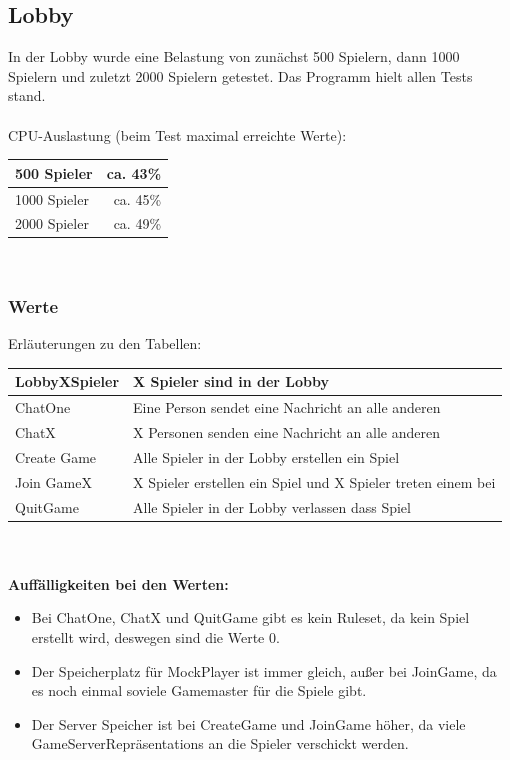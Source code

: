 \documentclass[a4paper]{article}
\begin{document}
\subsection{Lobby}
In der Lobby wurde eine Belastung von zunächst 500 Spielern, dann 1000 Spielern und zuletzt 2000 Spielern getestet. Das Programm hielt allen Tests stand.
\ \\ \ \\
\noindent
CPU-Auslastung (beim Test maximal erreichte Werte):\\
\noindent
\begin{tabular}{|l|r|}
\hline 
500 Spieler & ca. 43\% \\ \hline
1000 Spieler & ca. 45\% \\ \hline
2000 Spieler & ca. 49\%\\ \hline
\end{tabular}
\ \\

\subsubsection{Werte}
Erläuterungen zu den Tabellen: \\
\noindent
\begin{tabular}{|l|l|}
\hline 
LobbyXSpieler & X Spieler sind in der Lobby\\ \hline
ChatOne & Eine Person sendet eine Nachricht an alle anderen \\ \hline
ChatX & X Personen senden eine Nachricht an alle anderen \\ \hline
Create Game & Alle Spieler in der Lobby erstellen ein Spiel \\ \hline
Join GameX & X Spieler erstellen ein Spiel und X Spieler treten einem bei \\ \hline
QuitGame & Alle Spieler in der Lobby verlassen dass Spiel \\ \hline
\end{tabular}

\ \\ \ \\
\noindent
\textbf{Auffälligkeiten bei den Werten:}\\
\begin{itemize}
\item Bei ChatOne, ChatX und QuitGame gibt es kein Ruleset, da kein Spiel erstellt wird, deswegen sind die Werte 0. 
\item Der Speicherplatz für MockPlayer ist immer gleich, außer bei JoinGame, da es noch einmal soviele Gamemaster für die Spiele gibt. 
\item Der Server Speicher ist bei CreateGame und JoinGame höher, da viele GameServerRepräsentations an die Spieler verschickt werden.
\end{itemize}
\end{document}
